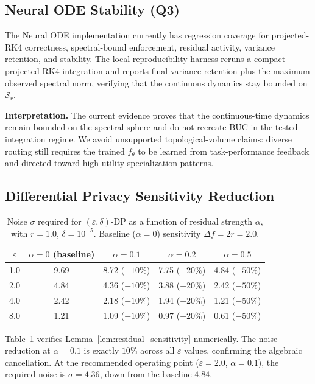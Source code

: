 \subsection{Neural ODE Stability (Q3)}
\label{sec:experiments_ode}

The Neural ODE implementation currently has regression coverage for projected-RK4
correctness, spectral-bound enforcement, residual activity, variance retention, and
stability.  The local reproducibility harness reruns a compact projected-RK4 integration
and reports final variance retention plus the maximum observed spectral norm, verifying
that the continuous dynamics stay bounded on $\mathcal{S}_r$.

\textbf{Interpretation.}  The current evidence proves that the continuous-time dynamics
remain bounded on the spectral sphere and do not recreate BUC in the tested integration
regime.  We avoid unsupported topological-volume claims: diverse routing still requires
the trained $f_\theta$ to be learned from task-performance feedback and directed toward
high-utility specialization patterns.

\subsection{Differential Privacy Sensitivity Reduction}
\label{sec:experiments_dp}

\begin{table}[b]
  \centering
  \caption{Noise $\sigma$ required for $(\varepsilon, \delta)$-DP as a function of
    residual strength $\alpha$, with $r=1.0$, $\delta=10^{-5}$.
    Baseline ($\alpha{=}0$) sensitivity $\Delta f = 2r = 2.0$.}
  \label{tab:dp_noise}
  \begin{tabular}{ccccc}
    \toprule
    $\varepsilon$ & $\alpha{=}0$ (baseline) & $\alpha{=}0.1$ & $\alpha{=}0.2$ & $\alpha{=}0.5$ \\
    \midrule
    1.0 & 9.69 & 8.72 ($-10\%$) & 7.75 ($-20\%$) & 4.84 ($-50\%$) \\
    2.0 & 4.84 & 4.36 ($-10\%$) & 3.88 ($-20\%$) & 2.42 ($-50\%$) \\
    4.0 & 2.42 & 2.18 ($-10\%$) & 1.94 ($-20\%$) & 1.21 ($-50\%$) \\
    8.0 & 1.21 & 1.09 ($-10\%$) & 0.97 ($-20\%$) & 0.61 ($-50\%$) \\
    \bottomrule
  \end{tabular}
\end{table}

Table~\ref{tab:dp_noise} verifies Lemma~\ref{lem:residual_sensitivity} numerically.
The noise reduction at $\alpha{=}0.1$ is exactly $10\%$ across all $\varepsilon$
values, confirming the algebraic cancellation.  At the recommended operating point
($\varepsilon{=}2.0$, $\alpha{=}0.1$), the required noise is $\sigma = 4.36$, down from
the baseline $4.84$.

